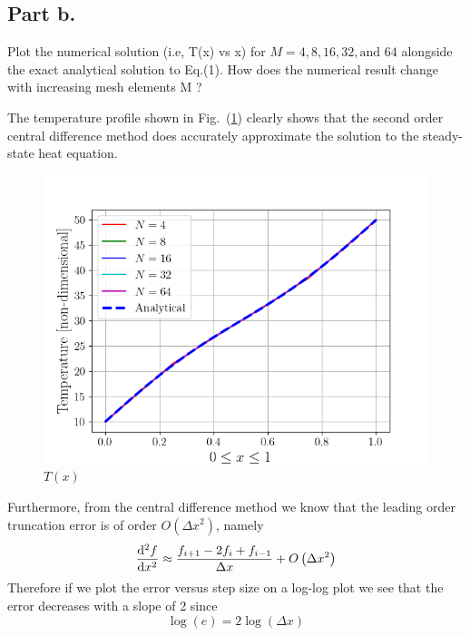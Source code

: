 \subsection{Part b.}
Plot the numerical solution (i.e, T(x) vs x) for $M = 4, 8, 16, 32, \text{
    and } 64$ alongside the exact analytical solution to Eq.(1). How does
the numerical result change with increasing mesh elements M ?
\begin{mdframed}[style=MyFrame]
    The temperature profile shown in Fig.~(\ref{fig:temperature-profile})
    clearly shows that the second order central difference method does
    accurately approximate the solution to the steady-state heat equation.  
    \begin{figure}[H]
        \includegraphics[height=0.35\textheight]{../media/temperature-profile.png}
        \caption{$T(x)$}
        \label{fig:temperature-profile}
    \end{figure}
    Furthermore, from the central difference method we know that the leading
    order truncation error is of order $O\left( \Delta x^{2} \right)$, namely  
    \begin{equation}       
        \dv[2]{f}{x} \approx \frac{f_{i+1} - 2 f_{i} + f_{i-1}}{\Delta x} 
                            + O\left(\Delta x^{2} \right)
    \end{equation}
    Therefore if we plot the error versus step size on a log-log plot we see
    that the error decreases with a slope of 2 since 
    \begin{equation}
        \log(e) = 2 \log\left(\Delta x \right)
    \end{equation}

\end{mdframed}
